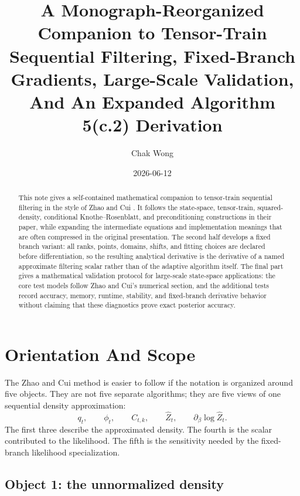 \documentclass[11pt]{article}
\title{A Monograph-Reorganized Companion to Tensor-Train Sequential Filtering, Fixed-Branch Gradients, Large-Scale Validation, And An Expanded Algorithm 5(c.2) Derivation}
\author{Chak Wong}
\date{2026-06-12}
\numberwithin{equation}{section}
\begin{document}
\maketitle

\begin{abstract}
This note gives a self-contained mathematical companion to tensor-train
sequential filtering in the style of Zhao and Cui \cite{zhao2024ttsequential}.
It follows the state-space, tensor-train, squared-density, conditional
Knothe--Rosenblatt, and preconditioning constructions in their paper, while
expanding the intermediate equations and implementation meanings that are often
compressed in the original presentation.  The second half develops a fixed
branch variant: all ranks, points, domains, shifts, and fitting choices are
declared before differentiation, so the resulting analytical derivative is the
derivative of a named approximate filtering scalar rather than of the adaptive
algorithm itself.  The final part gives a mathematical validation protocol for
large-scale state-space applications: the core test models follow Zhao and
Cui's numerical section, and the additional tests record accuracy, memory,
runtime, stability, and fixed-branch derivative behavior without claiming that
these diagnostics prove exact posterior accuracy.
\end{abstract}

\tableofcontents

\section{Orientation And Scope}

The Zhao and Cui \cite{zhao2024ttsequential} method is easier to follow if the notation is organized around
five objects.  They are not five separate algorithms; they are five views of
one sequential density approximation:
\begin{equation}
    q_t,\qquad \phi_t,\qquad C_{t,k},\qquad \widehat Z_t,
    \qquad \partial_\beta\log\widehat Z_t .
    \label{eq:p24-p22-o1}
\end{equation}
The first three describe the approximated density.  The fourth is the scalar
contributed to the likelihood.  The fifth is the sensitivity needed by the
fixed-branch likelihood specialization.

\subsection*{Object 1: the unnormalized density}
\end{document}
